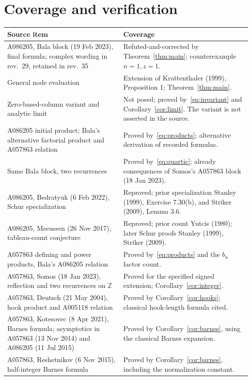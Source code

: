 \documentclass[11pt]{article}
\begin{document}
\section{Coverage and verification}
{\small\renewcommand{\arraystretch}{1.06}
\begin{longtable}{@{}>{\raggedright\arraybackslash}p{.45\linewidth}>{\raggedright\arraybackslash}p{.51\linewidth}@{}}
\toprule
Source item & Coverage\\\midrule
\endhead
A086205, Bala block (19 Feb 2023), final formula; complex wording in rev.~29, retained in rev.~35 & Refuted-and-corrected by Theorem~\ref{thm:main}; counterexample $n=1,z=1$.\\
General node evaluation & Extension of Krattenthaler (1999), Proposition 1; Theorem~\ref{thm:main}.\\
Zero-based-column variant and analytic limit & Not posed; proved by~\eqref{eq:invariant} and Corollary~\ref{cor:limit}. The variant is not asserted in the source.\\
A086205 initial product; Bala's alternative factorial product and A057863 relation & Proved by~\eqref{eq:products}; alternative derivation of recorded formulas.\\
Same Bala block, two recurrences & Proved by~\eqref{eq:quartic}; already consequences of Somos's A057863 block (18 Jan 2023).\\
A086205, Bedratyuk (6 Feb 2022), Schur specialization & Reproved; prior specialization Stanley (1999), Exercise 7.30(b), and Striker (2009), Lemma 3.6.\\
A086205, Meeussen (26 Nov 2017), tableau-count conjecture & Reproved; prior count Yutcis (1980); later Schur proofs Stanley (1999), Striker (2009).\\
A057863 defining and power products, Bala's A086205 relation & Proved by~\eqref{eq:products} and the $b_n$ factor count.\\
A057863, Somos (18 Jan 2023), reflection and two recurrences on $\mathbb Z$ & Proved for the specified signed extension; Corollary~\ref{cor:integer}.\\
A057863, Deutsch (21 May 2004), hook product and A005118 relation & Proved by Corollary~\ref{cor:hooks}; classical hook-length formula cited.\\
A057863, Kotesovec (8 Apr 2021), Barnes formula; asymptotics in A057863 (13 Nov 2014) and A086205 (11 Jul 2015) & Proved by Corollary~\ref{cor:barnes}, using the classical Barnes expansion.\\
A057863, Reshetnikov (6 Nov 2015), half-integer Barnes formula & Proved by Corollary~\ref{cor:barnes}, including the normalization constant.\\

\end{longtable}}
\end{document}
